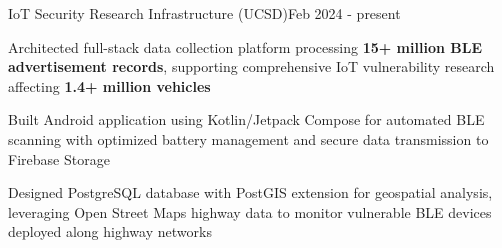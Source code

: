 \begin{joblong}{IoT Security Research Infrastructure (UCSD)}{Feb 2024 - present}
	\item Architected full-stack data collection platform processing \textbf{15+ million BLE advertisement records}, supporting comprehensive IoT vulnerability research affecting \textbf{1.4+ million vehicles}
	\item Built Android application using Kotlin/Jetpack Compose for automated BLE scanning with optimized battery management and secure data transmission to Firebase Storage
	\item Designed PostgreSQL database with PostGIS extension for geospatial analysis, leveraging Open Street Maps highway data to monitor vulnerable BLE devices deployed along highway networks
\end{joblong}
